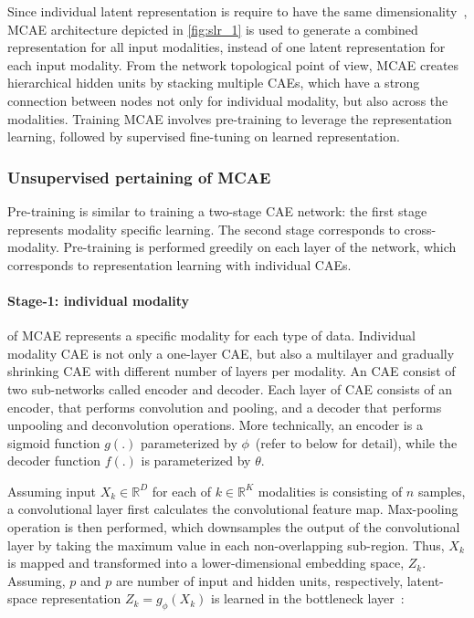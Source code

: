 \hspace*{3.5mm} Since individual latent representation is require to have the same dimensionality~\cite{mmdcae}, MCAE architecture depicted in \cref{fig:slr_1} is used to generate a combined representation for all input modalities, instead of one latent representation for each input modality. From the network topological point of view, MCAE creates hierarchical hidden units by stacking multiple CAEs, which have a strong connection between nodes not only for individual modality, but also across the modalities. Training MCAE involves pre-training to leverage the representation learning, followed by supervised fine-tuning on learned representation. 

\subsubsection{Unsupervised pertaining of MCAE} 
Pre-training is similar to training a two-stage CAE network: the first stage represents modality specific learning. The second stage corresponds to cross-modality. Pre-training is performed greedily on each layer of the network, which corresponds to representation learning with individual CAEs. 

\paragraph{Stage-1: individual modality}\hspace{-3mm} of MCAE represents a specific modality for each type of data. Individual modality CAE is not only a one-layer CAE, but also a multilayer and gradually shrinking CAE with different number of layers per modality. An CAE consist of two sub-networks called encoder and decoder. Each layer of CAE consists of an encoder, that performs convolution and pooling, and a decoder that performs unpooling and deconvolution operations. More technically, an encoder is a sigmoid function $g(.)$ parameterized by $\phi$~(refer to below for detail), while the decoder function $f(.)$ is parameterized by $\theta$. %

\hspace*{3.5mm} Assuming input $X_{k} \in \mathbb{R}^{D}$ for each of $k \in \mathbb{R}^K$ modalities is consisting of $n$ samples, a convolutional layer first calculates the convolutional feature map. Max-pooling operation is then performed, which downsamples the output of the convolutional layer by taking the maximum value in each non-overlapping sub-region. Thus, $X_{k}$ is mapped and transformed into a lower-dimensional embedding space, $Z_k$. Assuming, $p$ and $p$ are number of input and hidden units, respectively, latent-space representation $Z_k=g_{\phi}(X_{k})$ is learned in the bottleneck layer~\cite{mmdcae}: 

